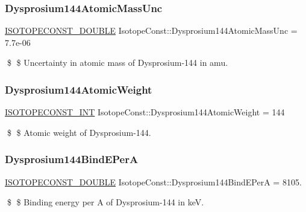 \subsubsection{\texorpdfstring{Dysprosium144\+Atomic\+Mass\+Unc}{Dysprosium144AtomicMassUnc}}
{\footnotesize\ttfamily \mbox{\hyperlink{group___isotope_const-_macros_ga8f45a7272ce02c0b4c65c44636ed719a}{I\+S\+O\+T\+O\+P\+E\+C\+O\+N\+S\+T\+\_\+\+D\+O\+U\+B\+LE}} Isotope\+Const\+::\+Dysprosium144\+Atomic\+Mass\+Unc = 7.\+7e-\/06}

\$ \$ Uncertainty in atomic mass of Dysprosium-\/144 in amu. \mbox{\label{group___isotope_const-_dysprosium-_dy144_ga12fe77ac571e7d54fababeffc51b6e08}} 
\subsubsection{\texorpdfstring{Dysprosium144\+Atomic\+Weight}{Dysprosium144AtomicWeight}}
{\footnotesize\ttfamily \mbox{\hyperlink{group___isotope_const-_macros_ga5f18360b3e99483a35c32d789e62621c}{I\+S\+O\+T\+O\+P\+E\+C\+O\+N\+S\+T\+\_\+\+I\+NT}} Isotope\+Const\+::\+Dysprosium144\+Atomic\+Weight = 144}

\$ \$ Atomic weight of Dysprosium-\/144. \mbox{\label{group___isotope_const-_dysprosium-_dy144_ga53709cd24e4d9b2eec9090aaeacd31ff}} 
\subsubsection{\texorpdfstring{Dysprosium144\+Bind\+E\+PerA}{Dysprosium144BindEPerA}}
{\footnotesize\ttfamily \mbox{\hyperlink{group___isotope_const-_macros_ga8f45a7272ce02c0b4c65c44636ed719a}{I\+S\+O\+T\+O\+P\+E\+C\+O\+N\+S\+T\+\_\+\+D\+O\+U\+B\+LE}} Isotope\+Const\+::\+Dysprosium144\+Bind\+E\+PerA = 8105.}

\$ \$ Binding energy per A of Dysprosium-\/144 in keV. \mbox{\label{group___isotope_const-_dysprosium-_dy144_gaa909bf4526c4543c20768688331f880a}} 
